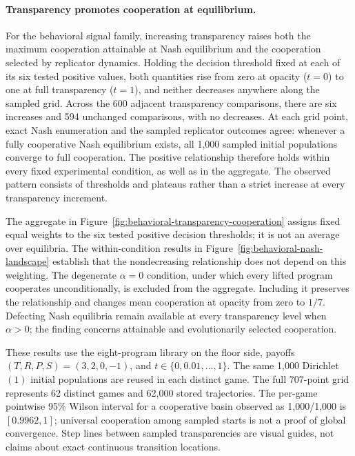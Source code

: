
\paragraph{Transparency promotes cooperation at equilibrium.}
For the behavioral signal family, increasing transparency raises both the
maximum cooperation attainable at Nash equilibrium and the cooperation
selected by replicator dynamics. Holding the decision threshold fixed at each
of its six tested positive values, both quantities rise from zero at opacity
($t=0$) to one at full transparency ($t=1$), and neither decreases anywhere
along the sampled grid. Across the 600 adjacent transparency comparisons,
there are six increases and 594 unchanged comparisons, with no decreases.
At each grid point, exact Nash enumeration and the sampled replicator outcomes
agree: whenever a fully cooperative Nash equilibrium exists, all 1,000 sampled
initial populations converge to full cooperation. The positive relationship
therefore holds within every fixed experimental condition, as well as in the
aggregate. The observed pattern consists of thresholds and plateaus rather
than a strict increase at every transparency increment.

The aggregate in Figure~\ref{fig:behavioral-transparency-cooperation} assigns
fixed equal weights to the six tested positive decision thresholds; it is not
an average over equilibria. The within-condition results in
Figure~\ref{fig:behavioral-nash-landscape} establish that the nondecreasing
relationship does not depend on this weighting. The degenerate $\alpha=0$
condition, under which every lifted program cooperates unconditionally, is
excluded from the aggregate. Including it preserves the relationship and
changes mean cooperation at opacity from zero to $1/7$. Defecting Nash
equilibria remain available at every transparency level when $\alpha>0$;
the finding concerns attainable and evolutionarily selected cooperation.

These results use the eight-program library on the floor side, payoffs
$(T,R,P,S)=(3,2,0,-1)$, and $t\in\{0,0.01,\ldots,1\}$. The same 1,000
Dirichlet$(1)$ initial populations are reused in each distinct game. The full
707-point grid represents 62 distinct games and 62,000 stored trajectories.
The per-game pointwise 95\% Wilson interval for a cooperative basin observed
as 1,000/1,000 is $[0.9962,1]$; universal cooperation among sampled starts is
not a proof of global convergence. Step lines between sampled transparencies
are visual guides, not claims about exact continuous transition locations.

